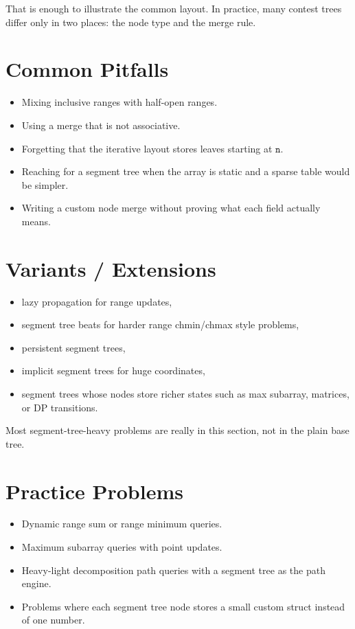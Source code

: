 That is enough to illustrate the common layout. In practice, many contest trees differ only in two places:
the node type and the merge rule.

\section*{Common Pitfalls}

\begin{itemize}
  \item Mixing inclusive ranges with half-open ranges.
  \item Using a merge that is not associative.
  \item Forgetting that the iterative layout stores leaves starting at \(\texttt{n}\).
  \item Reaching for a segment tree when the array is static and a sparse table would be simpler.
  \item Writing a custom node merge without proving what each field actually means.
\end{itemize}

\section*{Variants / Extensions}

\begin{itemize}
  \item lazy propagation for range updates,
  \item segment tree beats for harder range chmin/chmax style problems,
  \item persistent segment trees,
  \item implicit segment trees for huge coordinates,
  \item segment trees whose nodes store richer states such as max subarray, matrices, or DP transitions.
\end{itemize}

Most segment-tree-heavy problems are really in this section, not in the plain base tree.

\section*{Practice Problems}

\begin{itemize}
  \item Dynamic range sum or range minimum queries.
  \item Maximum subarray queries with point updates.
  \item Heavy-light decomposition path queries with a segment tree as the path engine.
  \item Problems where each segment tree node stores a small custom struct instead of one number.
\end{itemize}

